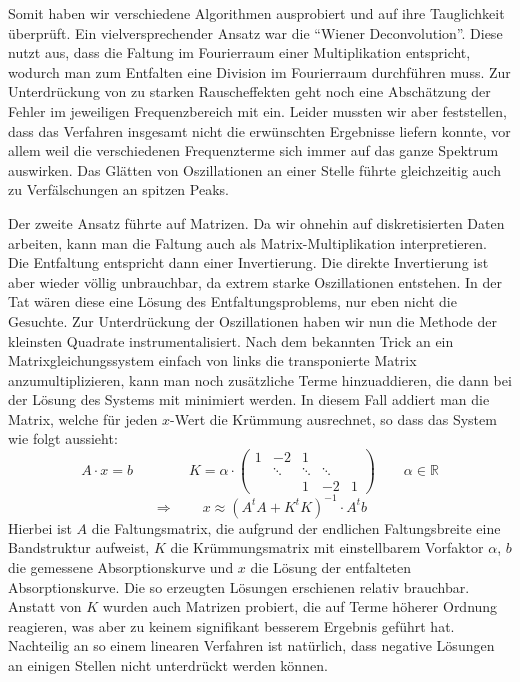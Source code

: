 \documentclass[11pt]{scrartcl}
\begin{document}
Somit haben wir verschiedene Algorithmen ausprobiert und auf ihre Tauglichkeit überprüft.
Ein vielversprechender Ansatz war die "`Wiener Deconvolution"'.
Diese nutzt aus, dass die Faltung im Fourierraum einer Multiplikation entspricht, wodurch man zum Entfalten eine Division im Fourierraum durchführen muss.
Zur Unterdrückung von zu starken Rauscheffekten geht noch eine Abschätzung der Fehler im jeweiligen Frequenzbereich mit ein.
Leider mussten wir aber feststellen, dass das Verfahren insgesamt nicht die erwünschten Ergebnisse liefern konnte, vor allem weil die verschiedenen Frequenzterme sich immer auf das ganze Spektrum auswirken.
Das Glätten von Oszillationen an einer Stelle führte gleichzeitig auch zu Verfälschungen an spitzen Peaks.

Der zweite Ansatz führte auf Matrizen.
Da wir ohnehin auf diskretisierten Daten arbeiten, kann man die Faltung auch als Matrix-Multiplikation interpretieren.
Die Entfaltung entspricht dann einer Invertierung.
Die direkte Invertierung ist aber wieder völlig unbrauchbar, da extrem starke Oszillationen entstehen.
In der Tat wären diese eine Lösung des Entfaltungsproblems, nur eben nicht die Gesuchte.
Zur Unterdrückung der Oszillationen haben wir nun die Methode der kleinsten Quadrate instrumentalisiert.
Nach dem bekannten Trick an ein Matrixgleichungssystem einfach von links die transponierte Matrix anzumultiplizieren, kann man noch zusätzliche Terme hinzuaddieren, die dann bei der Lösung des Systems mit minimiert werden.
In diesem Fall addiert man die Matrix, welche für jeden $x$-Wert die Krümmung ausrechnet, so dass das System wie folgt aussieht:
\begin{equation}
A\cdot x = b
\qquad\qquad
K = \alpha\cdot
\begin{pmatrix} 
  1 &	-2 &	1 &	&	\\
  &	\ddots&	\ddots&	\ddots&	\\
  &	&	1 &	-2 &	1
\end{pmatrix} 
\qquad
\alpha\in\mathbb{R}
\end{equation}
\begin{equation}
\Rightarrow\qquad
x \approx (A^t A + K^t K)^{-1}\cdot  A^t b
\end{equation}
Hierbei ist $A$ die Faltungsmatrix, die aufgrund der endlichen Faltungsbreite eine Bandstruktur aufweist, $K$ die Krümmungsmatrix mit einstellbarem Vorfaktor $\alpha$, $b$ die gemessene Absorptionskurve und $x$ die Lösung der entfalteten Absorptionskurve.
Die so erzeugten Lösungen erschienen relativ brauchbar.
Anstatt von $K$ wurden auch Matrizen probiert, die auf Terme höherer Ordnung reagieren, was aber zu keinem signifikant besserem Ergebnis geführt hat.
Nachteilig an so einem linearen Verfahren ist natürlich, dass negative Lösungen an einigen Stellen nicht unterdrückt werden können.
\end{document}
